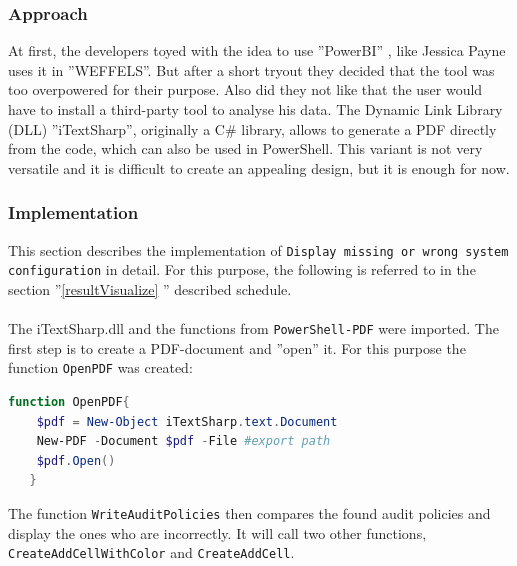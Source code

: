 \subsubsection{Approach}
At first, the developers toyed with the idea to use ''PowerBI'' \cite{PowerBI}, like Jessica Payne uses it in ''WEFFELS''. But after a short tryout they decided that the tool was too overpowered for their purpose. Also did they not like that the user would have to install a third-party tool to analyse his data. The Dynamic Link Library (DLL) ''iTextSharp'', originally a C\# library, allows to generate a PDF directly from the code, which can also be used in PowerShell. This variant is not very versatile and it is difficult to create an appealing design, but it is enough for now. 

\subsubsection{Implementation}
This section describes the implementation of \lstinline|Display missing or wrong system configuration| in detail. For this purpose, the following is referred to in the section ''\ref{resultVisualize} '' described schedule. \\\\
The iTextSharp.dll and the functions from \lstinline|PowerShell-PDF| \cite{PowerShell-PDF} were imported. The first step is to create a PDF-document and ''open'' it. For this purpose the function \lstinline|OpenPDF| was created:
\begin{lstlisting}[caption=Function OpenPDF, language=PowerShell]
function OpenPDF{
    $pdf = New-Object iTextSharp.text.Document 
    New-PDF -Document $pdf -File #export path
    $pdf.Open()
   }
\end{lstlisting}
The function \lstinline|WriteAuditPolicies| then compares the found audit policies and display the ones who are incorrectly. It will call two other functions, \lstinline|CreateAddCellWithColor| and \lstinline|CreateAddCell|.
